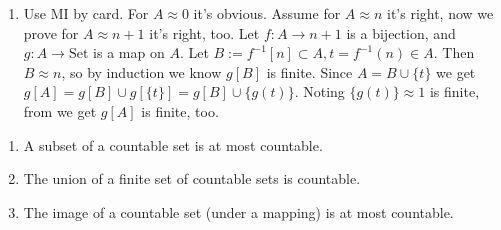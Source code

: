 \documentclass{ctexart}
\begin{document}
\begin{solution}
\begin{enumerate}
  \item Use MI by card. For $A\approx 0$ it's obvious. Assume for $A\approx n$ it's right, now we prove for $A\approx n+1$ it's right, too. Let $f:A\to n+1$ is a bijection, and $g:A\to\mathrm{Set}$ is a map on $A$. Let $B:=f^{-1}[n]\subset A,t=f^{-1}(n)\in A$. Then $B\approx n$, so by induction we know $g[B]$ is finite. Since $A=B\cup\{t\}$ we get $g[A]=g[B]\cup g[\{t\}]=g[B]\cup \{g(t)\}$. Noting $ \{g(t)\}\approx 1$ is finite, from  we get $g[A]$ is finite, too.
 \end{enumerate}
 
\end{solution}

\begin{problem}
 \begin{enumerate}
  \item A subset of a countable set is at most countable.
  \item The union of a finite set of countable sets is countable.
  \item The image of a countable set (under a mapping) is at most countable.
 \end{enumerate}
\end{problem}
\end{document}
